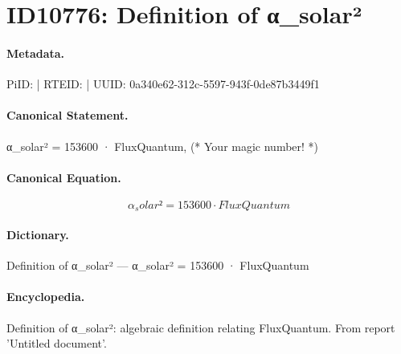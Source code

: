 \section*{ID10776: Definition of α\_solar²}
\paragraph{Metadata.}
PiID:  | RTEID:  | UUID: 0a340e62-312c-5597-943f-0de87b3449f1

\paragraph{Canonical Statement.}
α\_solar² = 153600 · FluxQuantum, (* Your magic number! *)

\paragraph{Canonical Equation.}
\[
α_solar² = 153600 · FluxQuantum
\]

\paragraph{Dictionary.}
Definition of α\_solar² — α\_solar² = 153600 · FluxQuantum

\paragraph{Encyclopedia.}
Definition of α\_solar²: algebraic definition relating FluxQuantum. From report 'Untitled document'.
